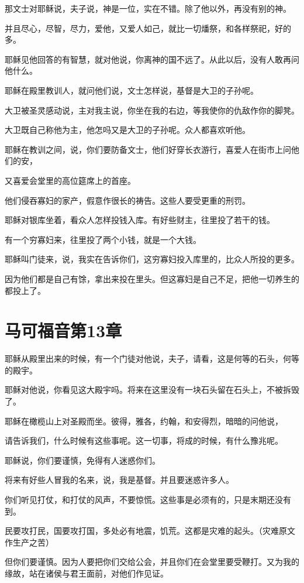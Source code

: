 \documentclass[12pt,oneside]{book}
\begin{document}
那文士对耶稣说，夫子说，神是一位，实在不错。除了他以外，再没有别的神。

并且尽心，尽智，尽力，爱他，又爱人如己，就比一切燔祭，和各样祭祀，好的多。

耶稣见他回答的有智慧，就对他说，你离神的国不远了。从此以后，没有人敢再问他什么。

耶稣在殿里教训人，就问他们说，文士怎样说，基督是大卫的子孙呢。

大卫被圣灵感动说，主对我主说，你坐在我的右边，等我使你的仇敌作你的脚凳。

大卫既自己称他为主，他怎吗又是大卫的子孙呢。众人都喜欢听他。

耶稣在教训之间，说，你们要防备文士，他们好穿长衣游行，喜爱人在街市上问他们的安，

又喜爱会堂里的高位筵席上的首座。

他们侵吞寡妇的家产，假意作很长的祷告。这些人要受更重的刑罚。

耶稣对银库坐着，看众人怎样投钱入库。有好些财主，往里投了若干的钱。

有一个穷寡妇来，往里投了两个小钱，就是一个大钱。

耶稣叫门徒来，说，我实在告诉你们，这穷寡妇投入库里的，比众人所投的更多。

因为他们都是自己有馀，拿出来投在里头。但这寡妇是自己不足，把他一切养生的都投上了。

\chapter{马可福音第13章}
耶稣从殿里出来的时候，有一个门徒对他说，夫子，请看，这是何等的石头，何等的殿宇。

耶稣对他说，你看见这大殿宇吗。将来在这里没有一块石头留在石头上，不被拆毁了。

耶稣在橄榄山上对圣殿而坐。彼得，雅各，约翰，和安得烈，暗暗的问他说，

请告诉我们，什么时候有这些事呢。这一切事，将成的时候，有什么豫兆呢。

耶稣说，你们要谨慎，免得有人迷惑你们。

将来有好些人冒我的名来，说，我是基督。并且要迷惑许多人。

你们听见打仗，和打仗的风声，不要惊慌。这些事是必须有的，只是末期还没有到。

民要攻打民，国要攻打国，多处必有地震，饥荒。这都是灾难的起头。（灾难原文作生产之苦）

但你们要谨慎。因为人要把你们交给公会，并且你们在会堂里要受鞭打。又为我的缘故，站在诸侯与君王面前，对他们作见证。
\end{document}
